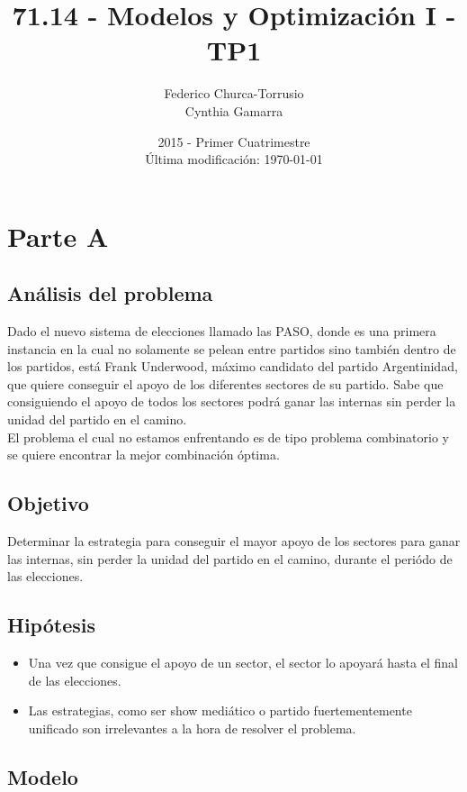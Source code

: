 \documentclass[10pt, a4paper, titlepage,
	oneside,
	fleqn, leqno]{article}
\title{71.14 - Modelos y Optimización I - TP1}
\author{
	Federico Churca-Torrusio\\
	Cynthia Gamarra}
\date{2015 - Primer Cuatrimestre\\
	Última modificación: \today}
\let\oldsection\section
\def\section{\cleardoublepage\oldsection}
\begin{document}
\maketitle
\thispagestyle{empty}
\cleardoublepage

\setcounter{page}{1}

\section{Parte A}

\subsection{Análisis del problema}
Dado el nuevo sistema de elecciones llamado las PASO, donde es una primera instancia en la cual no solamente se pelean entre partidos sino también dentro de los partidos, está Frank Underwood, máximo candidato del partido Argentinidad, que quiere conseguir el apoyo de los diferentes sectores de su partido. Sabe que consiguiendo el apoyo de todos los sectores podrá ganar las internas sin perder la unidad del partido en el camino.\\
El problema el cual no estamos enfrentando es de tipo problema combinatorio y se quiere encontrar la mejor combinación óptima.
\subsection{Objetivo}
Determinar la estrategia para conseguir el mayor apoyo de los sectores para ganar las internas, sin perder la unidad del partido en el camino, durante el periódo de las elecciones.

\subsection{Hipótesis}
\begin{itemize}
 \item Una vez que consigue el apoyo de un sector, el sector lo apoyará hasta el final de las elecciones.
 \item Las estrategias, como ser show mediático o partido fuertementemente unificado son irrelevantes a la hora de resolver el problema.
\end{itemize}
\subsection{Modelo}
\end{document}
